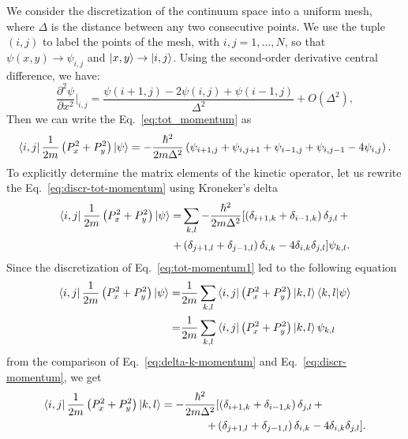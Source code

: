 We consider the discretization of the continuum space into a uniform mesh, where $\Delta$ is the distance between any two consecutive points. We use the tuple $(i,j)$ to label the points of the mesh, with $i,j = 1,\ldots , N$, so that $\psi(x,y) \rightarrow \psi_{i,j}$ and $\ket{x,y} \rightarrow \ket{i,j}$. Using the second-order derivative central difference, we have:
\begin{equation} \label{eq:second-order-derivative}
\frac{\partial^2 \psi}{\partial x^2} \bigg|_{i,j} = \frac{\psi(i+1,j) - 2 \psi(i,j) + \psi(i-1,j)}{\Delta^2} + O(\Delta^2),
\end{equation}
Then we can write the Eq.~\eqref{eq:tot_momentum} as
\begin{equation} \label{eq:discr-tot-momentum}
\bra{i,j} \frac{1}{2m} \left( P_x^2 + P_y^2 \right) \ket{\psi} = -\frac{\hbar^2}{2m\Delta^2} \left( \psi_{i+1,j} + \psi_{i,j+1} + \psi_{i-1,j} + \psi_{i,j-1} - 4 \psi_{i,j} \right).
\end{equation}
To explicitly determine the matrix elements of the kinetic operator, let us rewrite the Eq.~\eqref{eq:discr-tot-momentum} using Kroneker's delta
\begin{align} \label{eq:delta-k-momentum}
\bra{i,j} \frac{1}{2m} \left( P_x^2 + P_y^2 \right) \ket{\psi} = & \sum_{k,l} -\frac{\hbar^2}{2m\Delta^2} [ \left(  \delta_{i+1,k} + \delta_{i-1,k} \right) \delta_{j,l} \, +  \\ 
+ &  \left( \delta_{j+1,l} + \delta_{j-1,l} \right) \delta_{i,k} - 4 \delta_{i,k} \delta_{j,l} ] \psi_{k,l}. \nonumber
\end{align}
Since the discretization of Eq.~\eqref{eq:tot-momentum1} led to the following equation
\begin{subequations}
\begin{align}
\bra{i,j} \frac{1}{2m} \left( P_x^2 + P_y^2 \right) \ket{\psi} = & \frac{1}{2m} \sum_{k,l} \bra{i,j} \left( P_x^2 + P_y^2 \right) \ket{k,l} \braket{k,l|\psi} \\
= & \frac{1}{2m} \sum_{k,l} \bra{i,j} \left( P_x^2 + P_y^2 \right) \ket{k,l} \psi_{k,l} \label{eq:discr-momentum}
\end{align}
\end{subequations}
from the comparison of Eq.~\eqref{eq:delta-k-momentum} and Eq.~\eqref{eq:discr-momentum}, we get
\begin{align} \label{eq:delta-kroneker}
\bra{i,j} \frac{1}{2m} \left( P_x^2 + P_y^2 \right) \ket{k,l} = -\frac{\hbar^2}{2m\Delta^2} & [ \left( \delta_{i+1,k} + \delta_{i-1,k} \right) \delta_{j,l} \, + \\ + & \left( \delta_{j+1,l} + \delta_{j-1,l} \right) \delta_{i,k} - 4 \delta_{i,k} \delta_{j,l} ]. \nonumber
\end{align}

